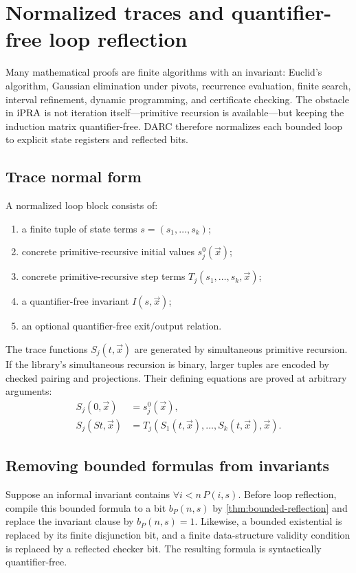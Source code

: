 \section{Normalized traces and quantifier-free loop reflection}
\label{sec:traces}

Many mathematical proofs are finite algorithms with an invariant: Euclid's
algorithm, Gaussian elimination under pivots, recurrence evaluation, finite
search, interval refinement, dynamic programming, and certificate checking.
The obstacle in \(\mathrm{iPRA}\) is not iteration itself---primitive recursion is
available---but keeping the induction matrix quantifier-free.  DARC therefore
normalizes each bounded loop to explicit state registers and reflected bits.

\subsection{Trace normal form}

A normalized loop block consists of:
\begin{enumerate}
  \item a finite tuple of state terms
        \(s=(s_1,\ldots,s_k)\);
  \item concrete primitive-recursive initial values \(s^0_j(\vec x)\);
  \item concrete primitive-recursive step terms
        \(T_j(s_1,\ldots,s_k,\vec x)\);
  \item a quantifier-free invariant \(I(s,\vec x)\);
  \item an optional quantifier-free exit/output relation.
\end{enumerate}
The trace functions \(S_j(t,\vec x)\) are generated by simultaneous primitive
recursion.  If the library's simultaneous recursion is binary, larger tuples
are encoded by checked pairing and projections.  Their defining equations are
proved at arbitrary arguments:
\begin{align*}
  S_j(0,\vec x)&=s^0_j(\vec x),\\
  S_j(S t,\vec x)&=T_j(S_1(t,\vec x),\ldots,S_k(t,\vec x),\vec x).
\end{align*}

\subsection{Removing bounded formulas from invariants}

Suppose an informal invariant contains
\(\forall i<n\,P(i,s)\).  Before loop reflection, compile this bounded
formula to a bit \(b_P(n,s)\) by \cref{thm:bounded-reflection} and replace the
invariant clause by \(b_P(n,s)=1\).  Likewise, a bounded existential is
replaced by its finite disjunction bit, and a finite data-structure validity
condition is replaced by a reflected checker bit.  The resulting formula is
syntactically quantifier-free.

